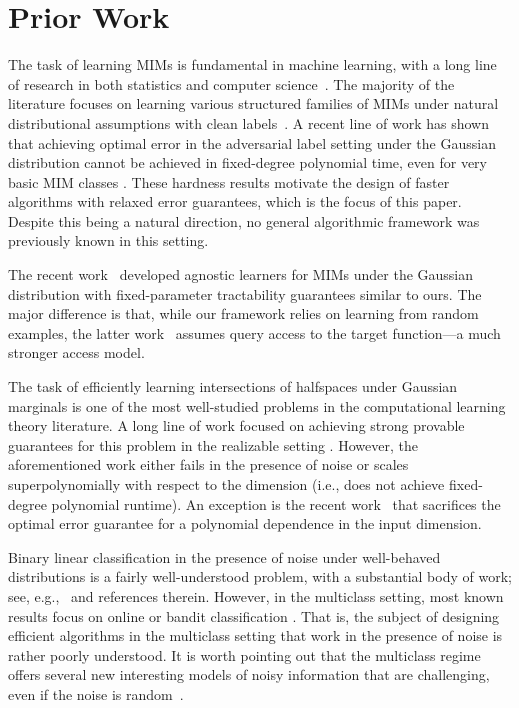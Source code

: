 \section{Prior Work}
The task of learning MIMs is fundamental in machine learning, 
with a long line of research in both statistics and computer 
science~\cite{Friedman:1980tu, Huber85-pp, Li91, 
HL93,xia2002adaptive, Xia08}.
The majority of the literature focuses on learning various structured families of MIMs under natural 
distributional assumptions with clean labels~\cite{GLM18,JSA15,DH18,BJW18,GeKLW19,DKKZ20,DLS22,BBSS22,CDGJM23}.
A recent line of work has shown that 
achieving optimal error in the adversarial label setting 
under the Gaussian distribution cannot be achieved in fixed-degree
polynomial time, even for very basic MIM classes \cite{DiakonikolasKPZ21, DKMR22b, Tieg23}. These hardness results motivate the design of faster algorithms with relaxed error guarantees, which is the focus of this paper. Despite this being a natural direction, no general algorithmic framework was previously known in this setting.



The recent work~\cite{DKKTZfocs24} developed 
agnostic learners for MIMs under the Gaussian distribution with 
fixed-parameter tractability 
guarantees similar to ours. The major difference is that, 
while our framework relies on learning from random examples, 
the latter work~\cite{DKKTZfocs24} assumes query access to the target 
function---a much stronger access model.  

The task of efficiently learning intersections of halfspaces 
under Gaussian marginals is one of the most well-studied problems 
in the computational learning theory literature. A 
long line of work focused on achieving strong provable 
guarantees for this problem in the realizable setting \cite{Vempala10,ArriagaVempala:99,KlivansLT09,Kos:04}. 
However, the aforementioned work either fails 
in the presence of noise or scales superpolynomially with respect to the dimension (i.e., does not achieve fixed-degree polynomial runtime). 
An exception is the recent work~\cite{DKS18-nasty} that 
sacrifices the optimal error guarantee for a polynomial dependence 
in the input dimension.

Binary linear classification in the presence of noise 
under well-behaved distributions is a fairly well-understood problem, 
with a substantial body of work; see, 
e.g.,~\cite{KKMS:05,ABL17, DKS18-nasty, DKTZ20, DKTZ20c, 
DiakonikolasKKT21, DKKTZ22} and references therein. However, in the 
multiclass setting, most known results focus on online or bandit 
classification \cite{banditron,BPSBDC19}. That is, 
the subject of designing efficient algorithms in the multiclass setting 
that work in the presence of noise is rather poorly understood.
It is worth pointing out that the multiclass regime 
offers several new interesting models of noisy information that are 
challenging, even if the noise is random~\cite{PRMNQ17,VanRooyencorrupted,
Fotakis2021coarselabellearning,cour2011partiallabel}.